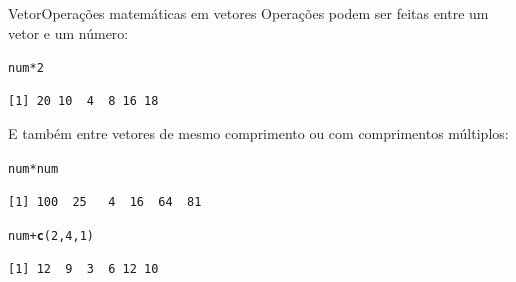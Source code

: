 \documentclass[10pt,handout]{beamer}\usepackage[]{graphicx}\usepackage[]{color}
\makeatletter
\newcommand{\hlnum}[1]{\textcolor[rgb]{0.686,0.059,0.569}{#1}}%
\newcommand{\hlopt}[1]{\textcolor[rgb]{0,0,0}{#1}}%
\newcommand{\hlstd}[1]{\textcolor[rgb]{0.345,0.345,0.345}{#1}}%
\newcommand{\hlkwd}[1]{\textcolor[rgb]{0.282,0.239,0.545}{\textbf{#1}}}%
\newenvironment{kframe}{%
 \def\at@end@of@kframe{}%
 \ifinner\ifhmode%
  \def\at@end@of@kframe{\end{minipage}}%
  \begin{minipage}{\columnwidth}%
 \fi\fi%
 \def\FrameCommand##1{\hskip\@totalleftmargin \hskip-\fboxsep
 \colorbox{shadecolor}{##1}\hskip-\fboxsep
     \hskip-\linewidth \hskip-\@totalleftmargin \hskip\columnwidth}%
 \MakeFramed {\advance\hsize-\width
   \@totalleftmargin\z@ \linewidth\hsize
   \@setminipage}}%
 {\par\unskip\endMakeFramed%
 \at@end@of@kframe}
\newenvironment{knitrout}{}{} %
\makeatother
\begin{document}
\begin{frame}[fragile]{Vetor}{Operações matemáticas em vetores}
Operações podem ser feitas entre um vetor e um número:
\begin{knitrout}\small
{}\color{fgcolor}\begin{kframe}
\begin{alltt}
\hlstd{num} \hlopt{*} \hlnum{2}
\end{alltt}
\begin{verbatim}
[1] 20 10  4  8 16 18
\end{verbatim}
\end{kframe}
\end{knitrout}

E também entre vetores de mesmo comprimento ou com comprimentos
múltiplos:
\begin{knitrout}\small
{}\color{fgcolor}\begin{kframe}
\begin{alltt}
\hlstd{num} \hlopt{*} \hlstd{num}
\end{alltt}
\begin{verbatim}
[1] 100  25   4  16  64  81
\end{verbatim}
\begin{alltt}
\hlstd{num} \hlopt{+} \hlkwd{c}\hlstd{(}\hlnum{2}\hlstd{,} \hlnum{4}\hlstd{,} \hlnum{1}\hlstd{)}
\end{alltt}
\begin{verbatim}
[1] 12  9  3  6 12 10
\end{verbatim}
\end{kframe}
\end{knitrout}

\end{frame}
\end{document}
